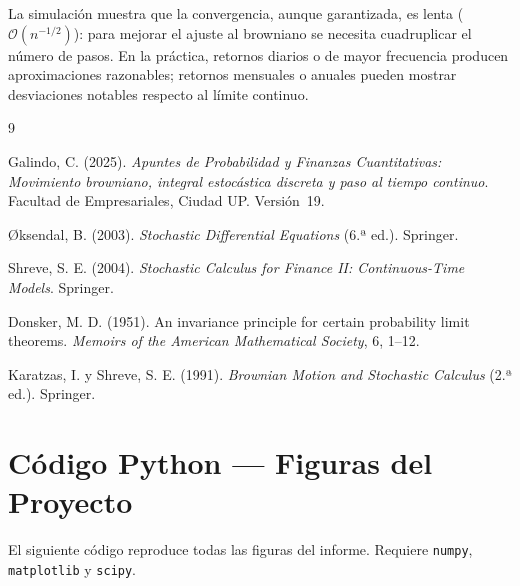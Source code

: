 \documentclass[12pt, a4paper]{article}
\begin{document}
La simulación muestra que la convergencia, aunque garantizada, es lenta
($\mathcal{O}(n^{-1/2})$): para mejorar el ajuste al browniano se necesita
cuadruplicar el número de pasos. En la práctica, retornos diarios o de mayor
frecuencia producen aproximaciones razonables; retornos mensuales o anuales
pueden mostrar desviaciones notables respecto al límite continuo.

\newpage
\begin{thebibliography}{9}

Galindo, C. (2025).
\textit{Apuntes de Probabilidad y Finanzas Cuantitativas: Movimiento browniano,
integral estocástica discreta y paso al tiempo continuo}.
Facultad de Empresariales, Ciudad UP. Versión~19.

Øksendal, B. (2003).
\textit{Stochastic Differential Equations} (6.ª ed.).
Springer.

Shreve, S. E. (2004).
\textit{Stochastic Calculus for Finance II: Continuous-Time Models}.
Springer.

Donsker, M. D. (1951).
An invariance principle for certain probability limit theorems.
\textit{Memoirs of the American Mathematical Society}, 6, 1--12.

Karatzas, I. y Shreve, S. E. (1991).
\textit{Brownian Motion and Stochastic Calculus} (2.ª ed.).
Springer.

\end{thebibliography}

\newpage
\appendix
\section{Código Python — Figuras del Proyecto}

El siguiente código reproduce todas las figuras del informe.
Requiere \texttt{numpy}, \texttt{matplotlib} y \texttt{scipy}.
\end{document}
